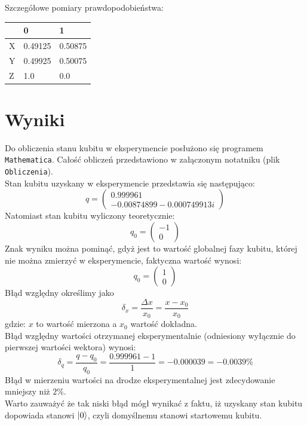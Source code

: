 \documentclass{article}
\begin{document}
Szczegółowe pomiary prawdopodobieństwa:\\
\begin{center}
\begin{tabular}{l|l|l|}
\cline{2-3}
                        & 0       & 1       \\ \hline
\multicolumn{1}{|l|}{X} & 0.49125 & 0.50875 \\ \hline
\multicolumn{1}{|l|}{Y} & 0.49925 & 0.50075 \\ \hline
\multicolumn{1}{|l|}{Z} & 1.0     & 0.0     \\ \hline
\end{tabular}
\end{center}
\section{Wyniki}
Do obliczenia stanu kubitu w eksperymencie posłużono się programem \verb+Mathematica+. Całość obliczeń przedstawiono w załączonym notatniku (plik \verb+Obliczenia+).\\
Stan kubitu uzyskany w eksperymencie przedstawia się następująco:
$$ q=\left(\begin{matrix}0.999961 \\-0.00874899-0.000749913 i\end{matrix}\right)$$
Natomiast stan kubitu wyliczony teoretycznie:
$$q_0=\left(\begin{matrix}-1\\0\end{matrix}\right)$$
Znak wyniku można pominąć, gdyż jest to wartość globalnej fazy kubitu, której nie można zmierzyć w eksperymencie, faktyczna wartość wynosi:
$$q_0=\left(\begin{matrix}1\\0\end{matrix}\right)$$
Błąd względny określimy jako $$\delta_x=\frac{\Delta x}{x_0}=\frac{x-x_0}{x_0}$$ gdzie: $x$ to wartość mierzona a $x_0$ wartość dokładna.\\
Błąd względny wartości otrzymanej eksperymentalnie (odniesiony wyłącznie do pierwszej wartości wektora) wynosi:
$$\delta_q=\frac{q-q_0}{q_0}=\frac{0.999961-1}{1}=-0.000039=-0.0039\%$$
Błąd w mierzeniu wartości na drodze eksperymentalnej jest zdecydowanie mniejszy niż $2\%$.\\
Warto zauważyć że tak niski błąd mógł wynikać z faktu, iż uzyskany stan kubitu dopowiada stanowi $\ket{0}$, czyli domyślnemu stanowi startowemu kubitu.
\end{document}
